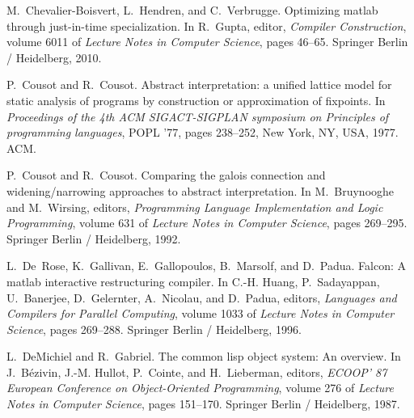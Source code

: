 \documentclass[9pt]{sigplanconf}
\begin{document}
\begin{thebibliography}{42}
M.~Chevalier-Boisvert, L.~Hendren, and C.~Verbrugge.
\newblock Optimizing matlab through just-in-time specialization.
\newblock In R.~Gupta, editor, \emph{Compiler Construction}, volume 6011 of
  \emph{Lecture Notes in Computer Science}, pages 46--65. Springer Berlin /
  Heidelberg, 2010.

P.~Cousot and R.~Cousot.
\newblock Abstract interpretation: a unified lattice model for static analysis
  of programs by construction or approximation of fixpoints.
\newblock In \emph{Proceedings of the 4th ACM SIGACT-SIGPLAN symposium on
  Principles of programming languages}, POPL '77, pages 238--252, New York, NY,
  USA, 1977. ACM.

P.~Cousot and R.~Cousot.
\newblock Comparing the galois connection and widening/narrowing approaches to
  abstract interpretation.
\newblock In M.~Bruynooghe and M.~Wirsing, editors, \emph{Programming Language
  Implementation and Logic Programming}, volume 631 of \emph{Lecture Notes in
  Computer Science}, pages 269--295. Springer Berlin / Heidelberg, 1992.

L.~De~Rose, K.~Gallivan, E.~Gallopoulos, B.~Marsolf, and D.~Padua.
\newblock Falcon: A matlab interactive restructuring compiler.
\newblock In C.-H. Huang, P.~Sadayappan, U.~Banerjee, D.~Gelernter, A.~Nicolau,
  and D.~Padua, editors, \emph{Languages and Compilers for Parallel Computing},
  volume 1033 of \emph{Lecture Notes in Computer Science}, pages 269--288.
  Springer Berlin / Heidelberg, 1996.

L.~DeMichiel and R.~Gabriel.
\newblock The common lisp object system: An overview.
\newblock In J.~Bézivin, J.-M. Hullot, P.~Cointe, and H.~Lieberman, editors,
  \emph{ECOOP’ 87 European Conference on Object-Oriented Programming}, volume
  276 of \emph{Lecture Notes in Computer Science}, pages 151--170. Springer
  Berlin / Heidelberg, 1987.


\end{thebibliography}
\end{document}
